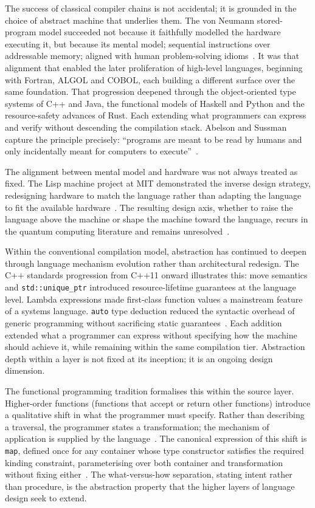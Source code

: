The success of classical compiler chains is not accidental; it is grounded in the choice of abstract machine that underlies them.
The von Neumann stored-program model succeeded not because it faithfully modelled the hardware executing it, but because its mental model; sequential instructions over addressable memory; aligned with human problem-solving idioms~\cite{elgotrobinson1964raspm}.
It was that alignment that enabled the later proliferation of high-level languages, beginning with Fortran, ALGOL and COBOL, each building a different surface over the same foundation.
That progression deepened through the object-oriented type systems of C++ and Java, the functional models of Haskell and Python and the resource-safety advances of Rust.
Each extending what programmers can express and verify without descending the compilation stack.
Abelson and Sussman capture the principle precisely: ``programs are meant to be read by humans and only incidentally meant for computers to execute''~\cite{abelson1996sicp}.

The alignment between mental model and hardware was not always treated as fixed.
The Lisp machine project at MIT demonstrated the inverse design strategy, redesigning hardware to match the language rather than adapting the language to fit the available hardware~\cite{greenblatt1975lisp}.
The resulting design axis, whether to raise the language above the machine or shape the machine toward the language, recurs in the quantum computing literature and remains unresolved~\cite{steele1993evolution}.

Within the conventional compilation model, abstraction has continued to deepen through language mechanism evolution rather than architectural redesign.
The C++ standards progression from C++11 onward illustrates this: move semantics and \texttt{std::unique\_ptr} introduced resource-lifetime guarantees at the language level.
Lambda expressions made first-class function values a mainstream feature of a systems language.
\texttt{auto} type deduction reduced the syntactic overhead of generic programming without sacrificing static guarantees~\cite{stroustrup2015resource}.
Each addition extended what a programmer can express without specifying how the machine should achieve it, while remaining within the same compilation tier.
Abstraction depth within a layer is not fixed at its inception; it is an ongoing design dimension.

The functional programming tradition formalises this within the source layer.
Higher-order functions (functions that accept or return other functions) introduce a qualitative shift in what the programmer must specify.
Rather than describing a traversal, the programmer states a transformation; the mechanism of application is supplied by the language~\cite{pierce2002tapl-doc9}.
The canonical expression of this shift is \texttt{map}, defined once for any container whose type constructor satisfies the required kinding constraint, parameterising over both container and transformation without fixing either~\cite{pierce2002tapl-doc9}.
The what-versus-how separation, stating intent rather than procedure, is the abstraction property that the higher layers of language design seek to extend.

